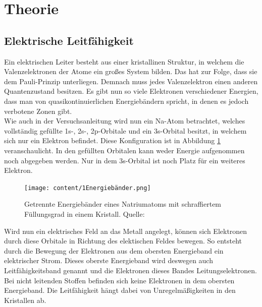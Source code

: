 \section{Theorie}
\label{sec:Theorie}
\subsection{Elektrische Leitfähigkeit}
Ein elektrischen Leiter besteht aus einer kristallinen Struktur, in welchem die Valenzelektronen der Atome
ein großes System bilden. Das hat zur Folge, dass sie dem Pauli-Prinzip unterliegen. Demnach muss jedes 
Valenzelektron einen anderen Quantenzustand besitzen. Es gibt nun so viele Elektronen verschiedener Energien,
dass man von quasikontinuierlichen Energiebändern spricht, in denen es jedoch verbotene Zonen gibt.\\
Wie auch in der Versuchsanleitung \cite{AP01}
wird nun ein Na-Atom betrachtet, welches vollständig gefüllte 1s-, 2s-, 2p-Orbitale und ein 3s-Orbital besitzt,
in welchem sich nur ein Elektron befindet. Diese Konfiguration ist in Abbildung \ref{fig:Energiebander}
veranschaulicht. In den gefüllten Orbitalen kann weder Energie aufgenommen noch abgegeben werden. Nur in dem
3s-Orbital ist noch Platz für ein weiteres Elektron.\\
%
\begin{figure}[H]
    \centering
    \texttt{[image: content/1Energiebänder.png]}
    \caption{Getrennte Energiebänder eines Natriumatoms mit schraffiertem Füllungsgrad in einem Kristall. Quelle: \cite{AP01}}
    \label{fig:Energiebander}
\end{figure}
%
\noindent Wird nun ein elektrisches Feld an das Metall angelegt, können sich Elektronen durch diese Orbitale in Richtung des 
elektischen Feldes bewegen. So entsteht durch die Bewegung der Elektronen aus dem obersten Energieband
ein elektrischer Strom. Dieses oberste Energieband wird deswegen auch Leitfähigkeitsband genannt und die 
Elektronen dieses Bandes Leitungselektronen. Bei nicht leitenden Stoffen befinden sich keine Elektronen in dem
obersten Energieband. Die Leitfähigkeit hängt dabei von Unregelmäßigkeiten in den Kristallen ab.
